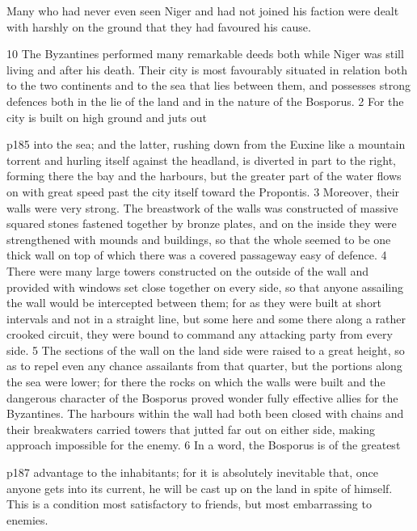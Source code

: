 Many who had never even seen Niger and had not joined his faction were dealt with harshly on the ground that they had favoured his cause.

10
The Byzantines performed many remarkable deeds both while Niger was still living and after his death. Their city is most favourably situated in relation both to the two continents and to the sea that lies between them, and possesses strong defences both in the lie of the land and in the nature of the Bosporus. 2 For the city is built on high ground and juts out

p185 into the sea; and the latter, rushing down from the Euxine like a mountain torrent and hurling itself against the headland, is diverted in part to the right, forming there the bay and the harbours, but the greater part of the water flows on with great speed past the city itself toward the Propontis. 3 Moreover, their walls were very strong. The breastwork of the walls was constructed of massive squared stones fastened together by bronze plates, and on the inside they were strengthened with mounds and buildings, so that the whole seemed to be one thick wall on top of which there was a covered passageway easy of defence. 4 There were many large towers constructed on the outside of the wall and provided with windows set close together on every side, so that anyone assailing the wall would be intercepted between them; for as they were built at short intervals and not in a straight line, but some here and some there along a rather crooked circuit, they were bound to command any attacking party from every side. 5 The sections of the wall on the land side were raised to a great height, so as to repel even any chance assailants from that quarter, but the portions along the sea were lower; for there the rocks on which the walls were built and the dangerous character of the Bosporus proved wonder ­fully effective allies for the Byzantines. The harbours within the wall had both been closed with chains and their breakwaters carried towers that jutted far out on either side, making approach impossible for the enemy. 6 In a word, the Bosporus is of the greatest

p187 advantage to the inhabitants; for it is absolutely inevitable that, once anyone gets into its current, he will be cast up on the land in spite of himself. This is a condition most satisfactory to friends, but most embarrassing to enemies.

